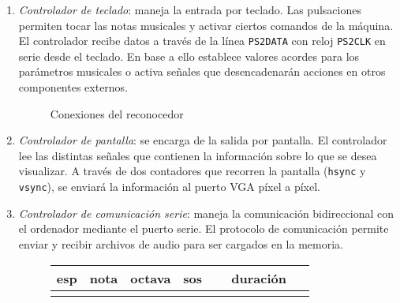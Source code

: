 \documentclass{article}
\begin{document}
\begin{enumerate}
	\item {\itshape Controlador de teclado}: maneja la entrada por teclado. Las pulsaciones permiten tocar las notas musicales y activar ciertos comandos de la máquina. El controlador recibe datos a través de la línea \verb|PS2DATA| con reloj \verb|PS2CLK| en serie desde el teclado. En base a ello establece valores acordes para los parámetros musicales o activa señales que desencadenarán acciones en otros componentes externos.

\begin{figure}[ht]\centering

	\caption{Conexiones del reconocedor}
	\label{fig:reconocedor}
\end{figure}

	\item {\itshape Controlador de pantalla}: se encarga de la salida por pantalla. El controlador lee las distintas señales que contienen la información sobre lo que se desea visualizar. A través de dos contadores que recorren la pantalla (\verb|hsync| y \verb|vsync|), se enviará la información al puerto VGA píxel a píxel.
	\item {\itshape Controlador de comunicación serie}: maneja la comunicación bidireccional con el ordenador mediante el puerto serie. El protocolo de comunicación permite enviar y recibir archivos de audio para ser cargados en la memoria.

	\begin{figure}[ht] \centering
		\begin{tabular}{| l | l | l | l | l | l | l | l | l | l | l | l | l | l | l | l |}
			\hline esp & \multicolumn{3}{c|}{nota} & \multicolumn{3}{c|}{octava} & sos & \multicolumn{8}{c|}{duración} \\ \hline
			& & & & & & & & & & & & & & & \\ \hline
		\end{tabular}


\end{figure}
\end{enumerate}
\end{document}
